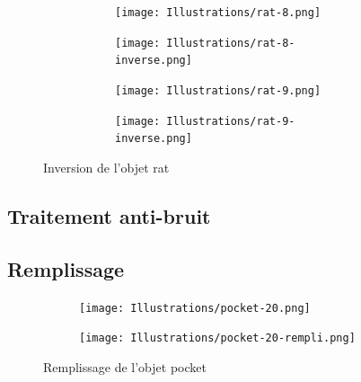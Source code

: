 \documentclass{article}
\begin{document}
      \begin{figure}[!h]
	\centering
	\begin{subfigure}{.49\textwidth}
	  \begin{subfigure}{.49\textwidth}
	    \centering
	    \texttt{[image: Illustrations/rat-8.png]}
	    \label{1strat}
	  \end{subfigure}
	  \begin{subfigure}{.49\textwidth}
	    \centering
	    \texttt{[image: Illustrations/rat-8-inverse.png]}
	    \label{1strat-inverse}
	  \end{subfigure}
	\end{subfigure}
	\begin{subfigure}{.49\textwidth}
	  \begin{subfigure}{.49\textwidth}
	    \centering
	    \texttt{[image: Illustrations/rat-9.png]}
	  \label{2ndrat}
	  \end{subfigure}
	  \begin{subfigure}{.49\textwidth}
	    \centering
	    \texttt{[image: Illustrations/rat-9-inverse.png]}
	  \label{2ndrat-inverse}
	  \end{subfigure}
	\end{subfigure}
	\caption{Inversion de l'objet rat}
	\label{anti-inversion}
      \end{figure}
  
    \subsection{Traitement anti-bruit}
    
    \subsection{Remplissage}
    
      \begin{figure}[!h]
	\centering
	\begin{subfigure}{.25\textwidth}
	  \centering
	  \texttt{[image: Illustrations/pocket-20.png]}
	  \label{pocket-non-rempli}
	\end{subfigure}
	\begin{subfigure}{.25\textwidth}
	  \centering
	  \texttt{[image: Illustrations/pocket-20-rempli.png]}
	\label{pocket-rempli}
	\end{subfigure}
	\caption{Remplissage de l'objet pocket}
	\label{remplissage}
      \end{figure}
      
\end{document}
